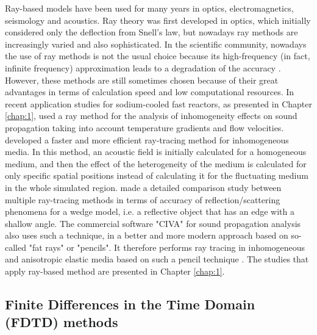         Ray-based models have been used for many years in optics, electromagnetics, seismology and acoustics. Ray theory was first developed in optics,
which initially considered only the deflection from Snell's law, but nowadays ray methods are increasingly varied and also sophisticated.
        In the scientific community, nowadays the use of ray methods is not the usual choice because its high-frequency (in fact, infinite frequency) approximation leads to a degradation of the accuracy
\parencite{Jensen2011ComputationalOceanAcoustics}. However, these methods are still sometimes chosen because of their great advantages in terms of calculation speed
and low computational resources.
In recent application studies for sodium-cooled fast reactors, as presented in Chapter \ref{chap:1}, \textcite{Massacret2014Modellingofultrasonic} used a ray method for
the analysis of inhomogeneity effects on sound propagation taking into account temperature gradients and flow velocities.
\textcite{Lue2012Stochasticsimulationof} developed a faster and more efficient ray-tracing method for inhomogeneous media.
In this method, an acoustic field is initially calculated for a homogeneous medium, and then the effect of the heterogeneity of the medium is calculated
for only specific spatial positions instead of calculating it for the fluctuating medium in the whole simulated region.
\textcite{Lue2016Numericalcomparisonof} made a detailed comparison study between multiple ray-tracing methods in terms of accuracy of reflection/scattering phenomena
for a wedge model, i.e. a reflective object that has an edge with a shallow angle.
The commercial software "CIVA" for sound propagation analysis also uses such a technique, in a better and more modern approach based on so-called "fat rays" or "pencils".
It therefore performs ray tracing in inhomogeneous and anisotropic elastic media based on such a pencil technique \parencite{Gengembre2000Pencilmethodin}.
The studies that apply ray-based method are presented in Chapter \ref{chap:1}.

    \subsection{Finite Differences in the Time Domain (FDTD) methods}
    \label{ssec:fdtd}

